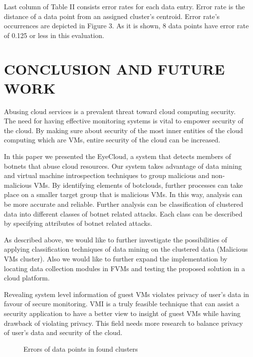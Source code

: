 \documentclass[conference]{IEEEtran}
\begin{document}
Last column of Table II consists error rates for each data entry. Error rate is the distance of a data point from an assigned cluster's centroid. Error rate's occurrences are depicted in Figure 3. As it is shown, 8 data points have error rate of 0.125 or less in this evaluation.  

\section{CONCLUSION AND FUTURE WORK}
Abusing cloud services is a prevalent threat toward cloud computing security. The need for having effective monitoring systems is vital to empower security of the cloud. By making sure about security of the most inner entities of the cloud computing which are VMs, entire security of the cloud can be increased. 

In this paper we presented the EyeCloud, a system that detects members of botnets that abuse cloud resources. Our system takes advantage of data mining and virtual machine introspection techniques to group malicious and non-malicious VMs. By identifying elements of botclouds, further processes can take place on a smaller target group that is malicious VMs. In this way, analysis can be more accurate and reliable. Further analysis can be classification of clustered data into different classes of botnet related attacks. Each class can be described by specifying attributes of botnet related attacks.  

As described above, we would like to further investigate the possibilities of applying classification techniques of data mining on the clustered data (Malicious VMs cluster). Also we would like to further expand the implementation by locating data collection modules in FVMs and testing the proposed solution in a cloud platform.  

Revealing system level information of guest VMs violates privacy of user's data in favour of secure monitoring. VMI is a truly feasible technique that can assist a security application to have a better view to insight of guest VMs while having drawback of violating privacy. This field needs more research to balance privacy of user's data and security of the cloud.
\begin{figure}
\begin{center}
\caption{Errors of data points in found clusters}
\end{center}
\end{figure}
\balance



\end{document}

